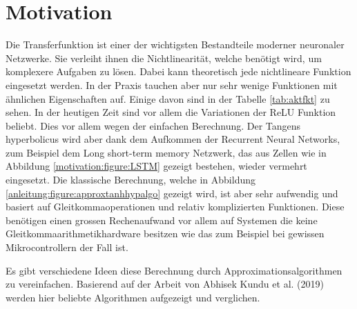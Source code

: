 %
%
%
\section{Motivation\label{transfer:section:teil0}}

Die Transferfunktion ist einer der wichtigsten Bestandteile moderner neuronaler Netzwerke. Sie verleiht ihnen die Nichtlinearität, welche benötigt wird, um komplexere Aufgaben zu lösen. Dabei kann theoretisch jede nichtlineare Funktion eingesetzt werden. In der Praxis tauchen aber nur sehr wenige Funktionen mit ähnlichen Eigenschaften auf. Einige davon sind in der Tabelle \ref{tab:aktfkt} zu sehen. In der heutigen Zeit sind vor allem die Variationen der ReLU Funktion beliebt. Dies vor allem wegen der einfachen Berechnung.
Der Tangens hyperbolicus wird aber dank dem Aufkommen der Recurrent Neural Networks, zum Beispiel dem Long short-term memory Netzwerk, das aus Zellen wie in Abbildung \ref{motivation:figure:LSTM} gezeigt bestehen, wieder vermehrt eingesetzt.
Die klassische Berechnung, welche in Abbildung \ref{anleitung:figure:approxtanhhypalgo} gezeigt wird, ist aber sehr aufwendig und basiert auf Gleitkommaoperationen und relativ komplizierten Funktionen. Diese benötigen einen grossen Rechenaufwand vor allem auf Systemen die keine Gleitkommaarithmetikhardware besitzen wie das zum Beispiel bei gewissen Mikrocontrollern der Fall ist.

Es gibt verschiedene Ideen diese Berechnung durch Approximationsalgorithmen zu vereinfachen. Basierend auf der Arbeit von Abhisek Kundu et al. (2019) \cite{transfer:DBLP:journals/corr/abs-1909-07729} werden hier beliebte Algorithmen aufgezeigt und verglichen.

